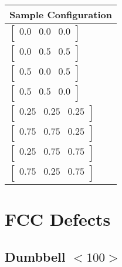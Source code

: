 \renewcommand{\arraystretch}{1.1}
\begin{table}[!htbp]
\begin{tabular}{l}
Sample Configuration\\
\hline
$\begin{bmatrix} 0.0 & 0.0 & 0.0 \\ \end{bmatrix} $ \\
$\begin{bmatrix} 0.0 & 0.5 & 0.5 \\ \end{bmatrix} $ \\
$\begin{bmatrix} 0.5 & 0.0 & 0.5 \\ \end{bmatrix} $ \\
$\begin{bmatrix} 0.5 & 0.5 & 0.0 \\ \end{bmatrix} $ \\
$\begin{bmatrix} 0.25 & 0.25 & 0.25 \\ \end{bmatrix} $ \\
$\begin{bmatrix} 0.75 & 0.75 & 0.25 \\ \end{bmatrix} $ \\
$\begin{bmatrix} 0.25 & 0.75 & 0.75 \\ \end{bmatrix} $ \\
$\begin{bmatrix} 0.75 & 0.25 & 0.75 \\ \end{bmatrix} $ \\
\end{tabular}
\label{tab:Zincblende}
\caption{}
\end{table}








\section{FCC Defects}


\subsection{Dumbbell $<100>$}

